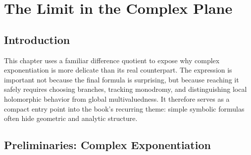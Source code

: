 \chapter{The Limit in the Complex Plane}

\begingroup


\def\C{\mathbb{C}}

\def\R{\mathbb{R}}

\def\Z{\mathbb{Z}}

\def\N{\mathbb{N}}

\def\Q{\mathbb{Q}}

\def\Log{\operatorname{Log}}

\def\Arg{\operatorname{Arg}}

\def\re{\operatorname{Re}}

\def\im{\operatorname{Im}}

\begin{abstract}
We examine the limit $\lim_{z \to a} \frac{z^n - a^n}{z - a}$ where $z, a, n \in \C$. For non-integral exponents, this expression is not a single complex-valued quotient until a local branch of $z^n$ has been fixed near $a$. Unlike the real case, the complex setting introduces fundamental complications: multi-valued functions, branch cuts, path dependence, and holomorphicity conditions. We provide a systematic treatment of all cases and subtleties.
\end{abstract}

\section{Introduction}

This chapter uses a familiar difference quotient to expose why complex
exponentiation is more delicate than its real counterpart. The expression is
important not because the final formula is surprising, but because reaching it
safely requires choosing branches, tracking monodromy, and distinguishing local
holomorphic behavior from global multivaluedness. It therefore serves as a
compact entry point into the book's recurring theme: simple symbolic formulas
often hide geometric and analytic structure.

\section{Preliminaries: Complex Exponentiation}


